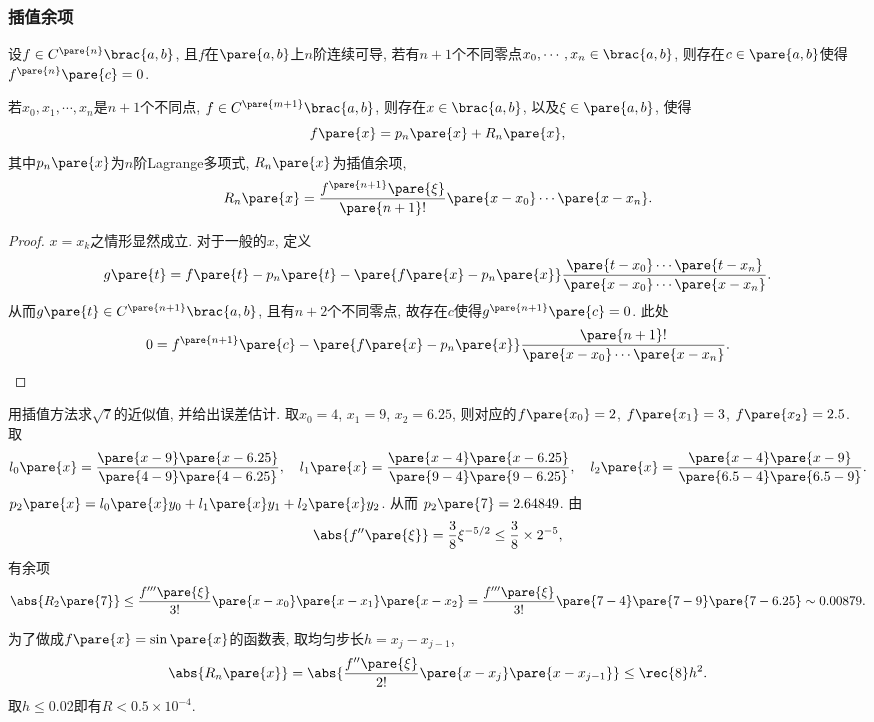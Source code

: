 \documentclass[hidelinks]{ctexart}
\begin{document}

\subsubsection{插值余项} %
\label{ssub:插值余项}

\begin{lemma}[广义Rolle定理]
    设$f\in C^{\pare{n}}\brac{a,b}$, 且$f$在$\pare{a,b}$上$n$阶连续可导, 若有$n+1$个不同零点$x_0,\cdots, x_n \in \brac{a,b}$, 则存在$c\in\pare{a,b}$使得$f^{\pare{n}}\pare{c} = 0$.
\end{lemma}
\begin{theorem}
    若$x_0,x_1,\cdots,x_n$是$n+1$个不同点, $f\in C^{\pare{m+1}}\brac{a,b}$, 则存在$x\in \brac{a,b}$, 以及$\xi\in \pare{a,b}$, 使得
    \[ f\pare{x} = p_n\pare{x} + R_n\pare{x}, \]
    其中$p_n\pare{x}$为$n$阶Lagrange多项式, $R_n\pare{x}$为插值余项,
    \[ R_n\pare{x} = \frac{f^{\pare{n+1}}\pare{\xi}}{\pare{n+1}!}\pare{x-x_0}\cdots\pare{x-x_n}. \]
\end{theorem}
\begin{proof}
    $x=x_k$之情形显然成立. 对于一般的$x$, 定义
    \[ g\pare{t} = f\pare{t} - p_n\pare{t} - \pare{f\pare{x} - p_n\pare{x}}\frac{\pare{t-x_0}\cdots \pare{t-x_n}}{\pare{x-x_0}\cdots \pare{x-x_n}}. \]
    从而$g\pare{t} \in C^{\pare{n+1}}\brac{a,b}$, 且有$n+2$个不同零点, 故存在$c$使得$g^{\pare{n+1}}\pare{c} = 0$. 此处
    \[ 0 = f^{\pare{n+1}}\pare{c} - \pare{f\pare{x} - p_n\pare{x}}\frac{\pare{n+1}!}{\pare{x-x_0}\cdots \pare{x-x_n}}. \qedhere \]
\end{proof}
\begin{ex}
    用插值方法求$\sqrt{7}$的近似值, 并给出误差估计. 取$x_0 = 4$, $x_1 = 9$, $x_2 = 6.25$, 则对应的$f\pare{x_0} = 2$, $f\pare{x_1} = 3$, $f\pare{x_2} = 2.5$. 取
    \[ l_0\pare{x} = \frac{\pare{x-9}\pare{x-6.25}}{\pare{4-9}\pare{4-6.25}},\quad l_1 \pare{x} = \frac{\pare{x-4}\pare{x-6.25}}{\pare{9-4}\pare{9-6.25}},\quad l_2\pare{x} = \frac{\pare{x-4}\pare{x-9}}{\pare{6.5-4}\pare{6.5-9}}. \]
    $p_2\pare{x} = \displaystyle l_0\pare{x}y_0 + l_1\pare{x}y_1 + l_2\pare{x}y_2$. 从而 $p_2\pare{7} = 2.64849$. 由
    \[ \abs{f''\pare{\xi}} = \frac{3}{8} \xi^{-5/2} \le \frac{3}{8}\times 2^{-5}, \]
    有余项
    \[ \abs{R_2\pare{7}} \le \frac{f'''\pare{\xi}}{3!}\pare{x - x_0}\pare{x-x_1}\pare{x-x_2} = \frac{f'''\pare{\xi}}{3!}\pare{7 - 4}\pare{7-9}\pare{7-6.25} \sim 0.00879. \]
\end{ex}
\begin{ex}
    为了做成$f\pare{x}=\sin\pare{x}$的函数表, 取均匀步长$h = x_{j} - x_{j-1}$,
    \[ \abs{R_n\pare{x}} = \abs{\frac{f''\pare{\xi}}{2!}\pare{x-x_j}\pare{x-x_{j-1}}} \le \rec{8}h^2. \]
    取$h\le 0.02$即有$R<0.5\times 10^{-4}$.
\end{ex}
\end{document}
